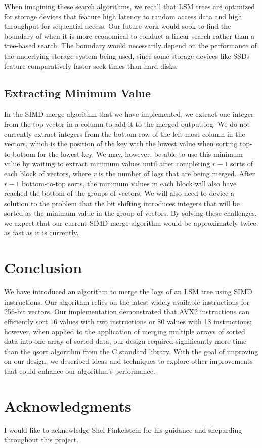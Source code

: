 \documentclass[10pt,twocolumn]{article}
\begin{document}
When imagining these search algorithms, we recall that LSM trees are optimized for storage devices that feature high latency to random access data and high throughput for sequential access.  Our future work would sook to find the boundary of when it is more economical to conduct a linear search rather than a tree-based search.  The boundary would necessarily depend on the performance of the underlying storage system being used, since some storage devices like SSDs feature comparatively faster seek times than hard disks.

\subsection{Extracting Minimum Value}
In the SIMD merge algorithm that we have implemented, we extract one integer from the top vector in a column to add it to the merged output log.  We do not currently extract integers from the bottom row of the left-most column in the vectors, which is the position of the key with the lowest value when sorting top-to-bottom for the lowest key.  We may, however, be able to use this minimum value by waiting to extract minimum values until after completing $r-1$ sorts of each block of vectors, where \textit{r} is the number of logs that are being merged.  After $r-1$ bottom-to-top sorts, the minimum values in each block will also have reached the bottom of the groups of vectors.  We will also need to device a solution to the problem that the bit shifting introduces integers that will be sorted as the minimum value in the group of vectors.  By solving these challenges, we expect that our current SIMD merge algorithm would be approximately twice as fast as it is currently.

\section{Conclusion}
We have introduced an algorithm to merge the logs of an LSM tree using SIMD instructions.  Our algorithm relies on the latest widely-available instructions for 256-bit vectors. Our implementation demonstrated that AVX2 instructions can efficiently sort 16 values with two instructions or 80 values with 18 instructions; however, when applied to the application of merging multiple arrays of sorted data into one array of sorted data, our design required significantly more time than the qsort algorithm from the C standard library.  With the goal of improving on our design, we described ideas and techniques to explore other improvements that could enhance our algorithm's performance.






\section*{Acknowledgments}
I would like to acknewledge Shel Finkelstein for his guidance and sheparding throughout this project.



\end{document}
